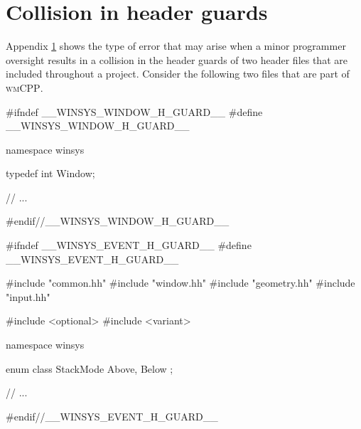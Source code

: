 \section{Collision in header guards}\label{appendixa}

Appendix \ref{appendixa} shows the type of error that may arise when a minor
programmer oversight results in a collision in the header guards of two header
files that are included throughout a \cpp project. Consider the following two
files that are part of \textsc{wmCPP}.

\begin{cppblock}
  #ifndef __WINSYS_WINDOW_H_GUARD__
  #define __WINSYS_WINDOW_H_GUARD__
  
  namespace winsys {

    typedef int Window;

    // ...

  }

  #endif//__WINSYS_WINDOW_H_GUARD__
\end{cppblock}

\begin{cppblock}
  #ifndef __WINSYS_EVENT_H_GUARD__
  #define __WINSYS_EVENT_H_GUARD__
  
  #include "common.hh"
  #include "window.hh"
  #include "geometry.hh"
  #include "input.hh"
  
  #include <optional>
  #include <variant>
  
  namespace winsys {

    enum class StackMode
    {
        Above,
        Below
    };
  
    // ...
  }
  #endif//__WINSYS_EVENT_H_GUARD__
\end{cppblock}

